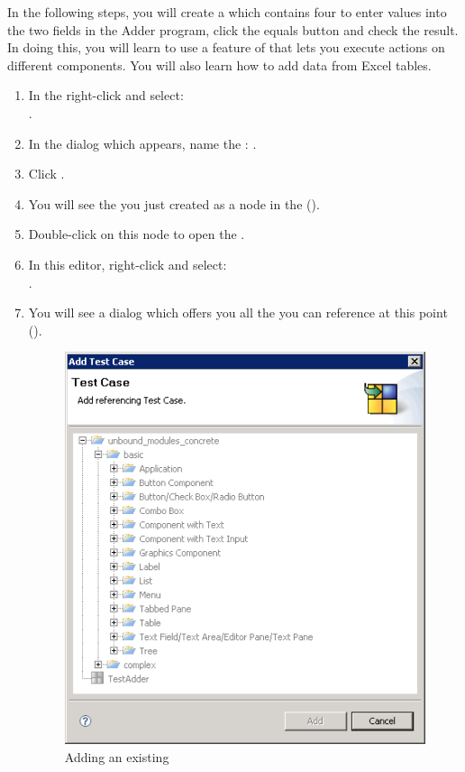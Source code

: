 In the following steps, you will create a \gdcase{} which  contains four \gdcases{} to enter values into the two fields in the Adder program, click the equals button and check the result. In doing this, you will learn to use a feature of \gd{} that lets you execute actions on different components. You will also learn how to add data from Excel tables. 

\begin{enumerate}
\item In the \gdtestcasebrowser{} right-click and select:\\ . 
\item In the dialog which appears, name the \gdcase{}: .
 \item Click . 
 \item You will see the \gdcase{} you just created as a node in the \gdtestcasebrowser{} ().
\item Double-click on this node to open the \gdtestcaseeditor{}. 
\item In this editor, right-click and select:\\ .
\item You will see a dialog which offers you all the \gdcases{} you can reference at this point ().

\begin{figure}[h]
\begin{center}
\includegraphics{Tutorials/PS/TutAddExistingTestCase}
\caption{Adding an existing \gdcase{}}
\label{TutAddExistingTestCase}
\end{center}
\end{figure}


\end{enumerate}
